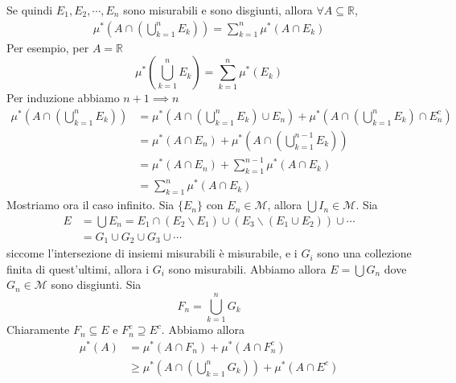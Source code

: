 \documentclass[a4paper]{article}
\begin{document}
{\begin{enumerate}
        Se quindi \(E_1, E_2, \cdots, E_n\) sono misurabili e sono disgiunti, allora
        \(\forall A \subseteq \mathbb{R}\),
        \begin{align*}
            \mu^*\left(
                A \cap \left(
                    \bigcup_{k=1}^n E_k
                \right)
            \right)
            = \sum_{k=1}^n \mu^*(A \cap E_k)
        \end{align*}
        Per esempio, per \(A= \mathbb{R}\)
        \[
            \mu^*\left(\bigcup_{k=1}^n E_k\right)
            = \sum_{k=1}^n \mu^*(E_k)
        \]
        Per induzione abbiamo \(n+1 \implies n\)
        \begin{align*}
            \mu^*\left(A \cap \left(\bigcup_{k=1}^n E_k\right)\right)
            &= \mu^*\left(A \cap \left(\bigcup_{k=1}^n E_k\right) \cup E_n\right)
            + \mu^*\left(
                A \cap \left(\bigcup_{k=1}^n E_k\right) \cap E_n^c
            \right) \\
            &= \mu^*(A \cap E_n) + \mu^*\left(A \cap \left(\bigcup_{k=1}^{n-1} E _k\right) \right) \\
            &= \mu^*\left(
                A \cap E_n
            \right)
            + \sum_{k=1}^{n-1} \mu^*(A \cap E_k) \\
            &= \sum_{k=1}^n \mu^*(A \cap E_k)
        \end{align*}
        Mostriamo ora il caso infinito. Sia \(\{E_n\}\) con \(E_n \in \mathcal{M}\),
        allora \(\bigcup I_n \in \mathcal{M}\). Sia
        \begin{align*}
            E &= \bigcup E_n = E_1 \cap (E_2 \backslash E_1) \cup (E_3 \backslash (E_1 \cup E_2)) \cup \cdots \\
            &= G_1 \cup G_2 \cup G_3 \cup \cdots
        \end{align*}
        siccome l'intersezione di insiemi misurabili è misurabile, e i \(G_i\) sono una collezione finita
        di quest'ultimi, allora i \(G_i\) sono misurabili.
        Abbiamo allora \(E = \bigcup G_n\) dove \(G_n \in \mathcal{M}\) sono disgiunti.
        Sia
        \[
            F_n = \bigcup_{k=1}^n G_k
        \]
        Chiaramente \(F_n \subseteq E\) e \(F_n^c \supseteq E^c\).
        Abbiamo allora
        \begin{align*}
            \mu^*(A) &= \mu^*(A \cap F_n) + \mu^*(A \cap F_n^c) \\
            &\geq \mu^*\left(A \cap \left(\bigcup_{k=1}^n G_k\right)\right)
             + \mu^*(A \cap E^c) \\

\end{align*}
\end{enumerate}}
\end{document}

